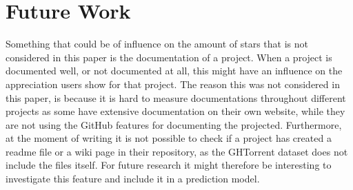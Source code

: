 \section{Future Work}
Something that could be of influence on the amount of stars that is not considered in this paper is the documentation of a project.
When a project is documented well, or not documented at all, this might have an influence on the appreciation users show for that project.
The reason this was not considered in this paper, is because it is hard to measure documentations throughout different projects as some have extensive documentation on their own website, while they are not using the GitHub features for documenting the projected.
Furthermore, at the moment of writing it is not possible to check if a project has created a readme file or a wiki page in their repository, as the GHTorrent dataset does not include the files itself. For future research it might therefore be interesting to investigate this feature and include it in a prediction model.


